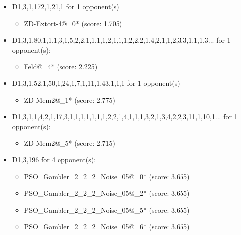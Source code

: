 \begin{appendices}
\begin{itemize}
    \item D1,3,1,172,1,21,1 for 1 opponent(s):
    \begin{multicols}{3}
         \begin{itemize}
            \item ZD-Extort-4@\_0* (score: 1.705)
        \end{itemize}
     \end{multicols}
     
    \item D1,3,1,80,1,1,1,3,1,5,2,2,1,1,1,1,2,1,1,1,2,2,2,1,4,2,1,1,2,3,3,1,1,1,3... for 1 opponent(s):
    \begin{multicols}{3}
         \begin{itemize}
            \item Feld@\_4* (score: 2.225)
        \end{itemize}
     \end{multicols}
     
    \item D1,3,1,52,1,50,1,24,1,7,1,11,1,43,1,1,1 for 1 opponent(s):
    \begin{multicols}{3}
         \begin{itemize}
            \item ZD-Mem2@\_1* (score: 2.775)
        \end{itemize}
     \end{multicols}
     
    \item D1,3,1,1,4,2,1,17,3,1,1,1,1,1,1,1,2,2,1,4,1,1,1,3,2,1,3,4,2,2,3,11,1,10,1... for 1 opponent(s):
    \begin{multicols}{3}
         \begin{itemize}
            \item ZD-Mem2@\_5* (score: 2.715)
        \end{itemize}
     \end{multicols}
     
    \item D1,3,196 for 4 opponent(s):
    \begin{multicols}{3}
         \begin{itemize}
            \item PSO\_Gambler\_2\_2\_2\_Noise\_05@\_0* (score: 3.655)
            \item PSO\_Gambler\_2\_2\_2\_Noise\_05@\_2* (score: 3.655)
            \item PSO\_Gambler\_2\_2\_2\_Noise\_05@\_5* (score: 3.655)
            \item PSO\_Gambler\_2\_2\_2\_Noise\_05@\_6* (score: 3.655)
        \end{itemize}
     \end{multicols}
     

\end{itemize}
\end{appendices}

